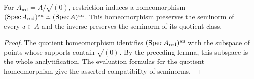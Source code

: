 \begin{theorem}\label{berk:reduction-homeomorphism}
\leanok
{}
For $A_{\mathrm{red}}=A/\sqrt{(0)}$, restriction induces a homeomorphism
$(\operatorname{Spec} A_{\mathrm{red}})^{\mathrm{an}}\simeq(\operatorname{Spec} A)^{\mathrm{an}}$.
This homeomorphism preserves the seminorm of every $a\in A$ and the inverse
preserves the seminorm of its quotient class.
\end{theorem}
\begin{proof}
The quotient homeomorphism identifies $(\operatorname{Spec} A_{\mathrm{red}})^{\mathrm{an}}$ with the
subspace of points whose supports contain $\sqrt{(0)}$. By the preceding lemma,
this subspace is the whole analytification. The evaluation formulas for the
quotient homeomorphism give the asserted compatibility of seminorms.
\end{proof}
